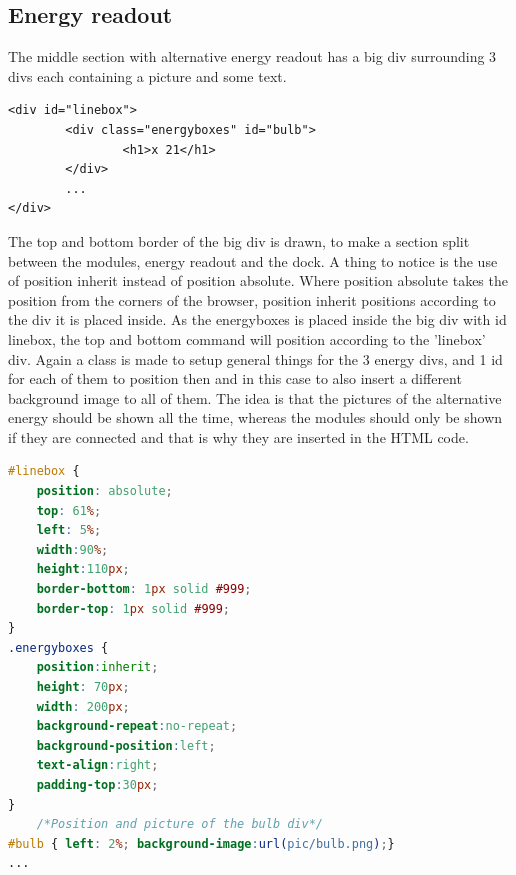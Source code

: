 \subsection{Energy readout}
The middle section with alternative energy readout has a big div surrounding 3 divs each containing a picture and some text.
\begin{lstlisting}
<div id="linebox">
		<div class="energyboxes" id="bulb">
				<h1>x 21</h1>
		</div>
		...
</div>
\end{lstlisting}
The top and bottom border of the big div is drawn, to make a section split between the modules, energy readout and the dock. A thing to notice is the use of position inherit instead of position absolute. Where position absolute takes the position from the corners of the browser, position inherit positions according to the div it is placed inside. As the energyboxes is placed inside the big div with id linebox, the top and bottom command will position according to the 'linebox' div. Again a class is made to setup general things for the 3 energy divs, and 1 id for each of them to position then and in this case to also insert a different background image to all of them. The idea is that the pictures of the alternative energy should be shown all the time, whereas the modules should only be shown if they are connected and that is why they are inserted in the HTML code.
\begin{lstlisting}[language=CSS]
#linebox {
	position: absolute;
	top: 61%;
	left: 5%;
	width:90%;
	height:110px;
	border-bottom: 1px solid #999;
	border-top: 1px solid #999;
}
.energyboxes {
	position:inherit;
	height: 70px;
	width: 200px;
	background-repeat:no-repeat;
	background-position:left;
	text-align:right;
	padding-top:30px;
}
	/*Position and picture of the bulb div*/
#bulb { left: 2%; background-image:url(pic/bulb.png);}
...
\end{lstlisting}

